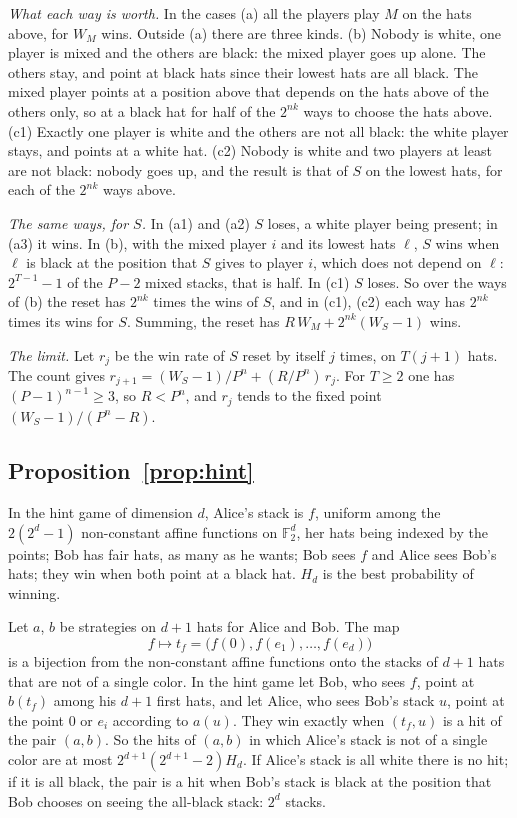 \documentclass[11pt,a4paper]{article}
\theoremstyle{definition}
\theoremstyle{remark}
\begin{document}
\emph{What each way is worth.} In the cases (a) all the players play $M$
on the hats above, for $W_M$ wins. Outside (a) there are three kinds.
(b) Nobody is white, one player is mixed and the others are black: the
mixed player goes up alone. The others stay, and point at black hats
since their lowest hats are all black. The mixed player points at a
position above that depends on the hats above of the others only, so at
a black hat for half of the $2^{nk}$ ways to choose the hats above.
(c1) Exactly one player is white and the others are not all black: the
white player stays, and points at a white hat. (c2) Nobody is white and
two players at least are not black: nobody goes up, and the result is
that of $S$ on the lowest hats, for each of the $2^{nk}$ ways above.

\emph{The same ways, for $S$.} In (a1) and (a2) $S$ loses, a white
player being present; in (a3) it wins. In (b), with the mixed player $i$
and its lowest hats $\ell$, $S$ wins when $\ell$ is black at the
position that $S$ gives to player $i$, which does not depend on $\ell$:
$2^{T-1}-1$ of the $P-2$ mixed stacks, that is half. In (c1) $S$ loses.
So over the ways of (b) the reset has $2^{nk}$ times the wins of $S$,
and in (c1), (c2) each way has $2^{nk}$ times its wins for $S$. Summing,
the reset has $R\,W_M + 2^{nk}(W_S - 1)$ wins.

\emph{The limit.} Let $r_j$ be the win rate of $S$ reset by itself $j$
times, on $T(j+1)$ hats. The count gives
$r_{j+1} = (W_S-1)/P^n + (R/P^n)\,r_j$. For $T \ge 2$ one has
$(P-1)^{n-1} \ge 3$, so $R < P^n$, and $r_j$ tends to the fixed point
$(W_S-1)/(P^n - R)$.

\subsection{Proposition~\ref{prop:hint}}\label{app:hint}

In the hint game of dimension $d$, Alice's stack is $f$, uniform among
the $2(2^d-1)$ non-constant affine functions on $\mathbb{F}_2^d$, her
hats being indexed by the points; Bob has fair hats, as many as he
wants; Bob sees $f$ and Alice sees Bob's hats; they win when both point
at a black hat. $H_d$ is the best probability of winning.

Let $a$, $b$ be strategies on $d+1$ hats for Alice and Bob. The map
\[ f \longmapsto t_f = \bigl(f(0), f(e_1), \ldots, f(e_d)\bigr) \]
is a bijection from the non-constant affine functions onto the stacks of
$d+1$ hats that are not of a single color. In the hint game let Bob, who sees $f$, point at
$b(t_f)$ among his $d+1$ first hats, and let Alice, who sees Bob's stack
$u$, point at the point $0$ or $e_i$ according to $a(u)$. They win
exactly when $(t_f,u)$ is a hit of the pair $(a,b)$. So the hits of
$(a,b)$ in which Alice's stack is not of a single color are at most
$2^{d+1}(2^{d+1}-2)H_d$. If Alice's stack is all white there is no hit;
if it is all black, the pair is a hit when Bob's stack is black at the
position that Bob chooses on seeing the all-black stack: $2^d$ stacks.
\end{document}
